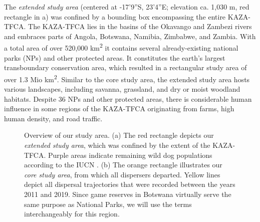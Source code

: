 \documentclass[abstract=on,10pt,a4paper,bibliography=totocnumbered]{scrartcl}
\begin{document}
The \textit{extended study area} (centered at -17'9''S, 23'4''E; elevation ca. 1,030 m, red rectangle in a) was confined
by a bounding box encompassing the entire KAZA-TFCA. The KAZA-TFCA lies in the
basins of the Okavango and Zambezi rivers and embraces parts of Angola,
Botswana, Namibia, Zimbabwe, and Zambia. With a total area of over 520,000
km\textsuperscript{2} it contains several already-existing national parks (NPs)
and other protected areas. It constitutes the earth's largest transboundary
conservation area, which resulted in a rectangular study area of over 1.3 Mio
km\textsuperscript{2}. Similar to the core study area, the extended study area
hosts various landscapes, including savanna, grassland, and dry or moist
woodland habitats. Despite 36 NPs and other protected areas, there is
considerable human influence in some regions of the KAZA-TFCA originating from
farms, high human density, and road traffic.

\begin{figure}[h]
  \begin{center}
    \caption{Overview of our study area. (a) The red rectangle depicts our
    \textit{extended study area}, which was confined by the extent of the
    KAZA-TFCA. Purple areas indicate remaining wild dog populations according to
    the IUCN \citep{Woodroffe.2012}. (b) The orange rectangle illustrates our
    \textit{core study area}, from which all dispersers departed. Yellow lines
    depict all dispersal trajectories that were recorded between the years 2011
    and 2019. Since game reserves in Botswana virtually serve the same purpose as
    National Parks, we will use the terms interchangeably for this region.}
    \label{StudyArea}
  \end{center}
\end{figure}
\end{document}
